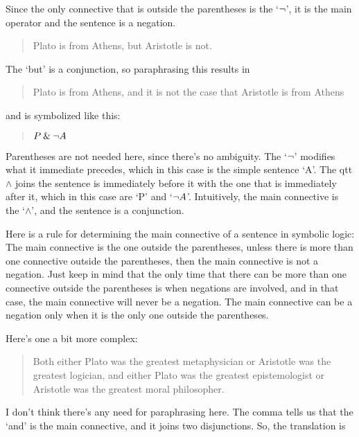 \documentclass[../logic-text.tex]{subfiles}
\begin{document}
\noindent Since the only connective that is outside the parentheses is the \enquote*{\(\neg\)}, it is the main operator and the sentence is a negation.



\begin{quote}
  Plato is from Athens, but Aristotle is not.
\end{quote}

The \enquote*{but} is a conjunction, so paraphrasing this results in

\begin{quote}
  Plato is from Athens, and it is not the case that Aristotle is from Athens
\end{quote}

and is symbolized like this:

\begin{quote}
  \(P \mathbin{\&} \neg A\)
\end{quote}

Parentheses are not needed here, since there's no ambiguity. The \enquote*{\(\neg\)} modifies what it immediate precedes, which in this case is the simple sentence \enquote*{A}. The qtt\(\land\) joins the sentence is immediately before it with the one that is immediately after it, which in this case are \enquote*{P} and \enquote*{\(\neg A\)}. Intuitively, the main connective is the \enquote*{\(\land\)}, and the sentence is a conjunction.

Here is a rule for determining the main connective of a sentence in symbolic logic:
The main connective is the one outside the parentheses, unless there is more than one connective outside the parentheses, then the main connective is not a negation. Just keep in mind that the only time that there can be more than one connective outside the parentheses is when negations are involved, and in that case, the main connective will never be a negation. The main connective can be a negation only when it is the only one outside the parentheses.


Here's one a bit more complex:

\begin{quote}
  Both either Plato was the greatest metaphysician or Aristotle was the greatest logician, and either Plato was the greatest epistemologist or Aristotle was the greatest moral philosopher.
\end{quote}

\noindent I don't think there's any need for paraphrasing here. The comma tells us that the \enquote*{and} is the main connective, and it joins two disjunctions. So, the translation is
\end{document}
